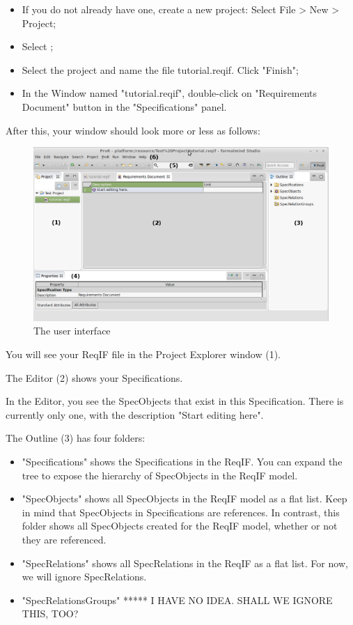 \begin{itemize}

\item
  If you do not already have one, create a new project: Select  File \textgreater{} New \textgreater{} Project;
\item
  Select ;
\item
  Select the project and name the file tutorial.reqif.  Click "Finish";
\item
  In the Window named "tutorial.reqif", double-click on "Requirements
  Document" button in the "Specifications" panel.
\end{itemize}

After this, your window should look more or less as follows:

\begin{figure}[h!]
  \centering
  \includegraphics[width=\linewidth]{../rmf-images/Screenshot_intro.png}
  \caption{The \pror{} user interface}
  \label{fig:user_interface_overview}
\end{figure}

You will see your ReqIF file in the Project Explorer window (1).

The Editor (2) shows your Specifications.

In the Editor, you see the SpecObjects that exist in this Specification.  There is currently only one, with the description "Start editing here".

The Outline (3) has four folders:

\begin{itemize}

\item
  "Specifications" shows the Specifications in the ReqIF.  You can expand the tree to expose the hierarchy of SpecObjects in the ReqIF model.
\item
  "SpecObjects" shows all SpecObjects in the ReqIF model as a flat list.  Keep in mind that SpecObjects in Specifications are references.  In contrast, this folder shows all SpecObjects created for the ReqIF model, whether or not they are referenced.
\item
  "SpecRelations" shows all SpecRelations in the ReqIF as a flat list.  For now, we will ignore SpecRelations.
\item
  "SpecRelationsGroups" ***** I HAVE NO IDEA.  SHALL WE IGNORE THIS, TOO?
\end{itemize}

